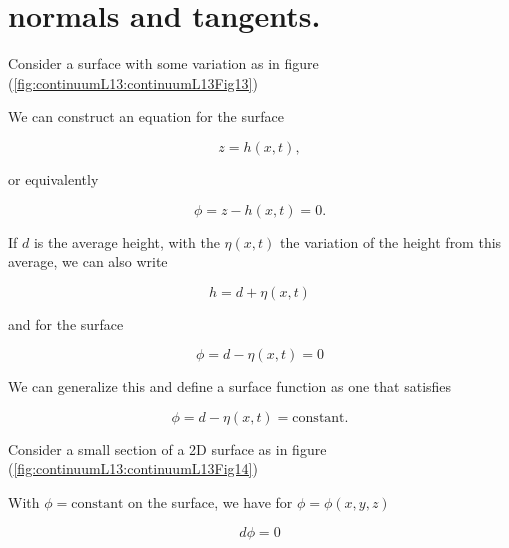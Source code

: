 \section{normals and tangents.}

Consider a surface with some variation as in figure (\ref{fig:continuumL13:continuumL13Fig13})


We can construct an equation for the surface

\begin{equation}\label{eqn:continuumL13:160}
z = h(x, t),
\end{equation}

or equivalently

\begin{equation}\label{eqn:continuumL13:180}
\phi = z - h(x, t) = 0.
\end{equation}

If $d$ is the average height, with the $\eta(x,t)$ the variation of the height from this average, we can also write

\begin{equation}\label{eqn:continuumL13:200}
h = d + \eta(x, t)
\end{equation}

and for the surface

\begin{equation}\label{eqn:continuumL13:220}
\phi = d - \eta(x, t) = 0
\end{equation}

We can generalize this and define a surface function as one that satisfies

\begin{equation}\label{eqn:continuumL13:220b}
\phi = d - \eta(x, t) = \text{constant}.
\end{equation}

Consider a small section of a 2D surface as in figure (\ref{fig:continuumL13:continuumL13Fig14})


With $\phi = \text{constant}$ on the surface, we have for $\phi = \phi(x, y, z)$

\begin{equation}\label{eqn:continuumL13:240}
d\phi = 0 
\end{equation}

